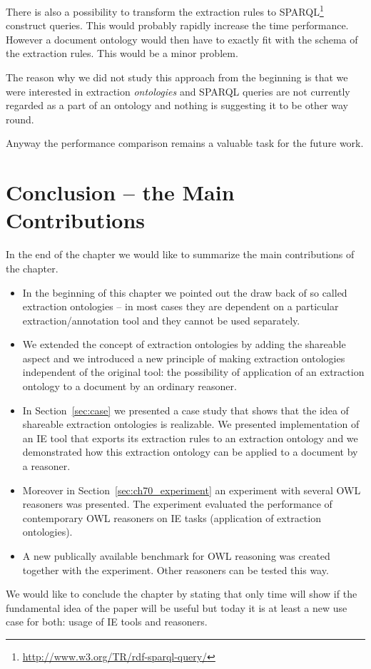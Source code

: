There is also a possibility to transform the extraction rules to SPARQL\footnote{\url{http://www.w3.org/TR/rdf-sparql-query/}} construct queries. This would probably rapidly increase the time performance. However a document ontology would then have to exactly fit with the schema of the extraction rules.  This would be a minor problem. 

The reason why we did not study this approach from the beginning is that we were interested in extraction \emph{ontologies} and SPARQL queries are not currently regarded as a part of an ontology and nothing is suggesting it to be other way round.  

Anyway the performance comparison remains a valuable task for the future work.






\section{Conclusion -- the Main Contributions}

In the end of the chapter we would like to summarize the main contributions of the chapter.

\begin{itemize}
	\item In the beginning of this chapter we pointed out the draw back of so called extraction ontologies -- in most cases they are dependent on a particular extraction/annotation tool and they cannot be used separately.	
	\item We extended the concept of extraction ontologies by adding the shareable aspect and we introduced a new principle of making extraction ontologies independent of the original tool: the possibility of application of an extraction ontology to a document by an ordinary reasoner.
	\item In Section~\ref{sec:case} we presented a case study that shows that the idea of shareable extraction ontologies is realizable. We presented implementation of an IE tool that exports its extraction rules to an extraction ontology and we demonstrated how this extraction ontology can be applied to a document by a reasoner.
	\item Moreover in Section~\ref{sec:ch70_experiment} an experiment with several OWL reasoners was presented. The experiment evaluated the performance of contemporary OWL reasoners on IE tasks (application of extraction ontologies).  
	\item A new publically available benchmark for OWL reasoning was created together with the experiment. Other reasoners can be tested this way.
\end{itemize}
   

We would like to conclude the chapter by stating that only time will show if the fundamental idea of the paper will be useful but today it is at least a new use case for both: usage of IE tools and reasoners.
